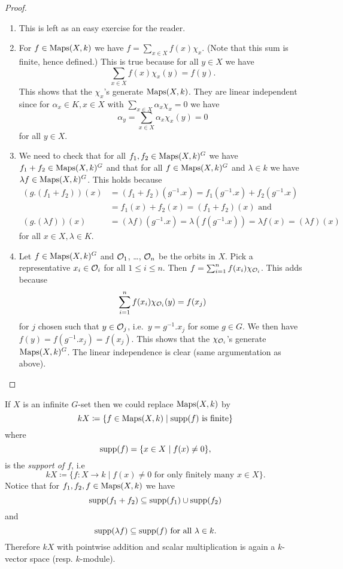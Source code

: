 \begin{proof}
 \begin{enumerate}[label=\emph{\alph*)},leftmargin=*]
  \item
   This is left as an easy exercise for the reader.
  \item
   For $f \in \operatorname{Maps}(X,k)$ we have $f = \sum_{x \in X} f(x) \chi_x$. (Note that this sum is finite, hence defined.) This is true because for all $y \in X$ we have
   \[
    \sum_{x \in X} f(x) \chi_x(y) = f(y).
   \]
   This shows that the $\chi_x$'s generate $\operatorname{Maps}(X,k)$. They are linear independent since for $\alpha_x \in K, x \in X$ with $\sum_{x \in X} \alpha_x \chi_x = 0$ we have
   \[
    \alpha_y = \sum_{x \in X} \alpha_x \chi_x(y) = 0
   \]
   for all $y \in X$.
  \item
   We need to check that for all $f_1, f_2 \in \operatorname{Maps}(X,k)^G$ we have $f_1+f_2 \in \operatorname{Maps}(X,k)^G$ and that for all $f \in \operatorname{Maps}(X,k)^G$ and $\lambda \in k$ we have $\lambda f \in \operatorname{Maps}(X,k)^G$. This holds because
   \begin{align*}
    (g.(f_1+f_2))(x)
    &= (f_1+f_2)(g^{-1}.x) = f_1(g^{-1}.x) + f_2(g^{-1}.x) \\
    &= f_1(x) + f_2(x) = (f_1+f_2)(x) \text{ and} \\
    (g.(\lambda f))(x)
    &= (\lambda f)(g^{-1}.x) = \lambda (f(g^{-1}.x)) = \lambda f(x) = (\lambda f)(x)
   \end{align*}
   for all $x \in X, \lambda \in K$.
  \item
   Let $f \in \operatorname{Maps}(X,k)^G$ and $\mathcal{O}_1$, \dots, $\mathcal{O}_n$ be the orbits in $X$. Pick a representative $x_i \in \mathcal{O}_i$ for all $1 \leq i \leq n$. Then $f = \sum_{i=1}^n f(x_i) \chi_{\mathcal{O}_i}$. This adds because
   \[
    \sum_{i=1}^n f(x_i) \chi_{\mathcal{O}_i}(y) = f(x_j)
   \]
   for $j$ chosen such that $y \in \mathcal{O}_j$, i.e.\ $y = g^{-1}.x_j$ for some $g \in G$. We then have $f(y) = f(g^{-1}.x_j) = f(x_j)$. This shows that the $\chi_{\mathcal{O}_i}$’s generate $\operatorname{Maps}(X,k)^G$. The linear independence is clear (same argumentation as above).
  \qedhere
 \end{enumerate}
\end{proof}


If $X$ is an infinite $G$-set then we could replace $\operatorname{Maps}(X,k)$ by
\[
 kX \coloneqq \{f \in \operatorname{Maps}(X,k) \mid \operatorname{supp}(f) \text{ is finite}\}
\]
where
\[
 \operatorname{supp}(f) = \{x \in X \mid f(x) \neq 0\},
\]
is the \emph{support of $f$}, i.e
\[
 kX \coloneqq \{f \colon X \to k \mid f(x) \neq 0 \text{ for only finitely many } x \in X\}.
\]
Notice that for $f_1, f_2, f \in \operatorname{Maps}(X,k)$ we have
\[
 \operatorname{supp}(f_1+f_2) \subseteq \operatorname{supp}(f_1) \cup \operatorname{supp}(f_2)
\]
and
\[
 \operatorname{supp}(\lambda f) \subseteq \operatorname{supp}(f) \text{ for all } \lambda \in k.
\]
Therefore $kX$ with pointwise addition and scalar multiplication is again a $k$-vector space (resp. $k$-module).

